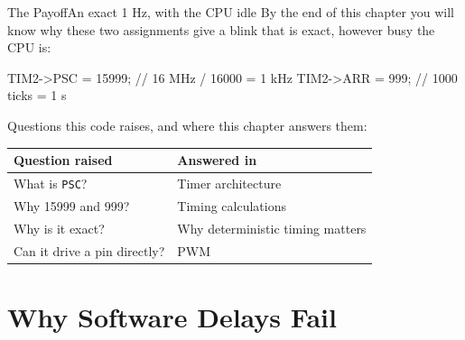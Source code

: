 \documentclass[9pt,aspectratio=169,xcolor=table]{beamer}
\begin{document}
{\beamerextras
\begin{frame}[fragile]{The Payoff}{An exact 1 Hz, with the CPU idle}
    \leavevmode
    By the end of this chapter you will know why these two assignments give a blink that is exact, however busy the CPU is:

    \vspace{2mm}
    \begin{center}
    \begin{minipage}{.9\textwidth}
\begin{cc}[basicstyle=\ttfamily\small]
TIM2->PSC = 15999;   // 16 MHz / 16000 = 1 kHz
TIM2->ARR = 999;     // 1000 ticks = 1 s
\end{cc}
    \end{minipage}
    \end{center}

    \vspace{2mm}
    {\small Questions this code raises, and where this chapter answers them:}

    \vspace{1mm}
    \begin{center}
    {\small
    \striped
    \begin{tabular}{@{}l R{.52\textwidth}@{}}
        \toprule
        \textbf{Question raised} & \textbf{Answered in} \\
        \midrule
        What is \texttt{PSC}? & Timer architecture \\
        Why 15999 and 999? & Timing calculations \\
        Why is it exact? & Why deterministic timing matters \\
        Can it drive a pin directly? & PWM \\
        \bottomrule
    \end{tabular}}
    \end{center}
\end{frame}
}


\section{Why Software Delays Fail}
\end{document}

